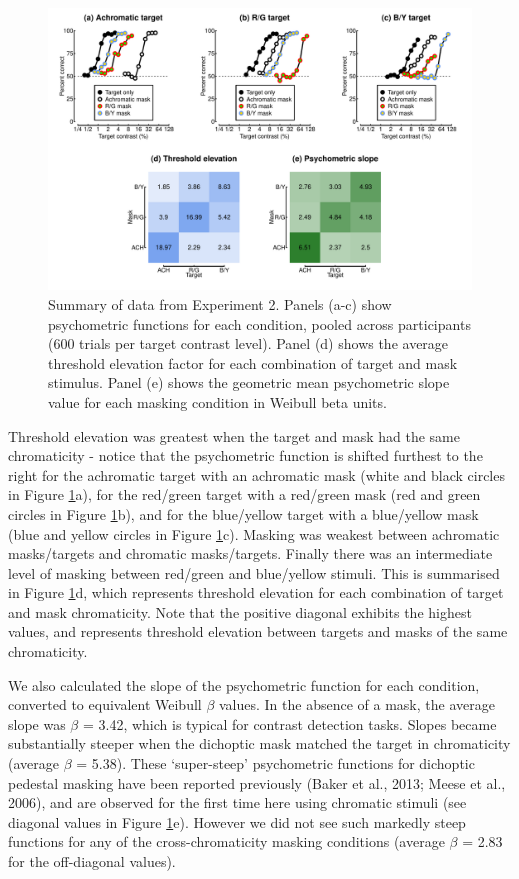 \documentclass[
]{article}
\begin{document}
\begin{figure}

{\centering \includegraphics{Figures/MCSdata} 

}

\caption{Summary of data from Experiment 2. Panels (a-c) show psychometric functions for each condition, pooled across participants (600 trials per target contrast level). Panel (d) shows the average threshold elevation factor for each combination of target and mask stimulus. Panel (e) shows the geometric mean psychometric slope value for each masking condition in Weibull beta units.}\label{fig:MCSfig}
\end{figure}

Threshold elevation was greatest when the target and mask had the same chromaticity - notice that the psychometric function is shifted furthest to the right for the achromatic target with an achromatic mask (white and black circles in Figure \ref{fig:MCSfig}a), for the red/green target with a red/green mask (red and green circles in Figure \ref{fig:MCSfig}b), and for the blue/yellow target with a blue/yellow mask (blue and yellow circles in Figure \ref{fig:MCSfig}c). Masking was weakest between achromatic masks/targets and chromatic masks/targets. Finally there was an intermediate level of masking between red/green and blue/yellow stimuli. This is summarised in Figure \ref{fig:MCSfig}d, which represents threshold elevation for each combination of target and mask chromaticity. Note that the positive diagonal exhibits the highest values, and represents threshold elevation between targets and masks of the same chromaticity.

We also calculated the slope of the psychometric function for each condition, converted to equivalent Weibull \(\beta\) values. In the absence of a mask, the average slope was \(\beta\) = 3.42, which is typical for contrast detection tasks. Slopes became substantially steeper when the dichoptic mask matched the target in chromaticity (average \(\beta\) = 5.38). These `super-steep' psychometric functions for dichoptic pedestal masking have been reported previously (Baker et al., 2013; Meese et al., 2006), and are observed for the first time here using chromatic stimuli (see diagonal values in Figure \ref{fig:MCSfig}e). However we did not see such markedly steep functions for any of the cross-chromaticity masking conditions (average \(\beta\) = 2.83 for the off-diagonal values).
\end{document}
